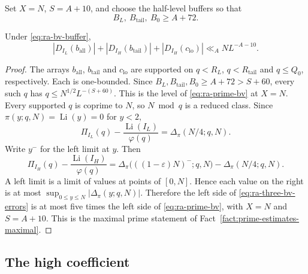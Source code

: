 Set \(X=N\), \(S=A+10\), and choose the half-level buffers so that
\begin{equation}\label{eq:ra-bv-buffer}
 B_L,\ B_{\mathrm{tail}},\ B_0\ge A+72.
\end{equation}
\begin{lemma}\label{lem:ra-n4-bv}
Under \eqref{eq:ra-bv-buffer},
\begin{equation}\label{eq:ra-three-bv-errors}
 |D_{I_L}(b_{\mathrm{all}})|+
 |D_{I_H}(b_{\mathrm{tail}})|+
 |D_{I_H}(c_{\mathrm{lo}})|\ll_A NL^{-A-10}.
\end{equation}
\end{lemma}
\begin{proof}
The arrays \(b_{\mathrm{all}}\), \(b_{\mathrm{tail}}\) and \(c_{\mathrm{lo}}\)
are supported on \(q<R_L\), \(q<R_{\mathrm{tail}}\) and \(q\le Q_0\),
respectively. Each is one-bounded. Since
\(B_L,B_{\mathrm{tail}},B_0\ge A+72>S+60\), every such \(q\) has
\(q\le N^{1/2}L^{-(S+60)}\).
This is the level of \eqref{eq:ra-prime-bv} at
\(X=N\). Every supported \(q\) is coprime to \(N\), so \(N\bmod q\) is a
reduced class. Since \(\pi(y;q,N)=\operatorname{Li}(y)=0\) for \(y<2\),
\[
 \Pi_{I_L}(q)-\frac{\operatorname{Li}(I_L)}{\varphi(q)}
   =\Delta_\pi(N/4;q,N).
\]
Write \(y^-\) for the left limit at \(y\). Then
\[
 \Pi_{I_H}(q)-\frac{\operatorname{Li}(I_H)}{\varphi(q)}
   =\Delta_\pi\bigl(((1-\varepsilon)N)^-;q,N\bigr)
    -\Delta_\pi(N/4;q,N).
\]
A left limit is a limit of values at points of \([0,N]\).
Hence each value on the right is at most
\(\sup_{0\le y\le N}|\Delta_\pi(y;q,N)|\).
Therefore the left side of
\eqref{eq:ra-three-bv-errors} is at most five times the left side of
\eqref{eq:ra-prime-bv}, with \(X=N\) and \(S=A+10\). This is the maximal
prime statement of Fact~\ref{fact:prime-estimates-maximal}.
\end{proof}


\subsection{The high coefficient}

